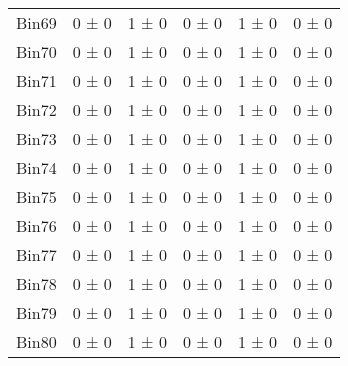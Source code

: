 \begin{tabular}{@{\extracolsep{4pt}}lccccc@{}}
     Bin69 & 0 ± 0 & 1 ± 0 & 0 ± 0 & 1 ± 0 & 0 ± 0 \\ 
     Bin70 & 0 ± 0 & 1 ± 0 & 0 ± 0 & 1 ± 0 & 0 ± 0 \\ 
     Bin71 & 0 ± 0 & 1 ± 0 & 0 ± 0 & 1 ± 0 & 0 ± 0 \\ 
     Bin72 & 0 ± 0 & 1 ± 0 & 0 ± 0 & 1 ± 0 & 0 ± 0 \\ 
     Bin73 & 0 ± 0 & 1 ± 0 & 0 ± 0 & 1 ± 0 & 0 ± 0 \\ 
     Bin74 & 0 ± 0 & 1 ± 0 & 0 ± 0 & 1 ± 0 & 0 ± 0 \\ 
     Bin75 & 0 ± 0 & 1 ± 0 & 0 ± 0 & 1 ± 0 & 0 ± 0 \\ 
     Bin76 & 0 ± 0 & 1 ± 0 & 0 ± 0 & 1 ± 0 & 0 ± 0 \\ 
     Bin77 & 0 ± 0 & 1 ± 0 & 0 ± 0 & 1 ± 0 & 0 ± 0 \\ 
     Bin78 & 0 ± 0 & 1 ± 0 & 0 ± 0 & 1 ± 0 & 0 ± 0 \\ 
     Bin79 & 0 ± 0 & 1 ± 0 & 0 ± 0 & 1 ± 0 & 0 ± 0 \\ 
     Bin80 & 0 ± 0 & 1 ± 0 & 0 ± 0 & 1 ± 0 & 0 ± 0 \\ 
\hline\hline
  \end{tabular}
